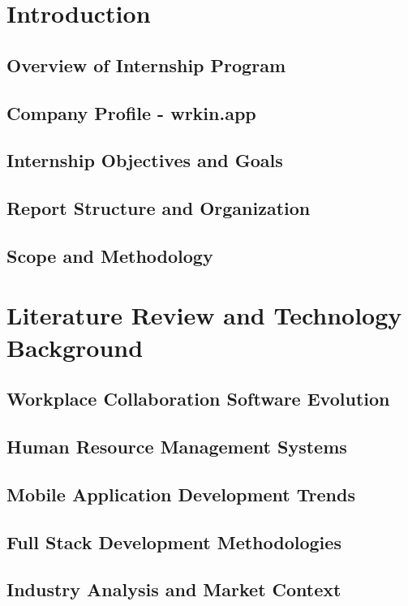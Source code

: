 \documentclass[a4paper, 11pt, oneside]{report}
\begin{document}
\chapter{Introduction}
  \section{Overview of Internship Program}
  \section{Company Profile - wrkin.app}
  \section{Internship Objectives and Goals}
  \section{Report Structure and Organization}
  \section{Scope and Methodology}
  

\chapter{Literature Review and Technology Background}
  \section{Workplace Collaboration Software Evolution}
  \section{Human Resource Management Systems}
  \section{Mobile Application Development Trends}
  \section{Full Stack Development Methodologies}
  \section{Industry Analysis and Market Context}
  
\end{document}
